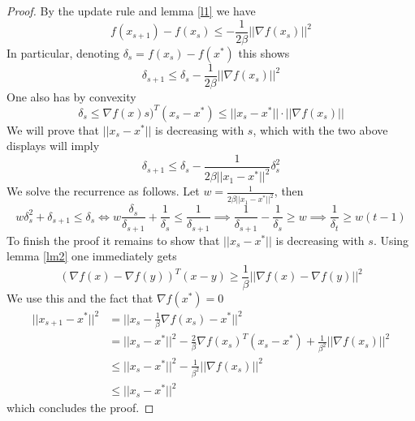 \begin{proof}
By the update rule and lemma \ref{l1} we have
$$f(x_{s+1}) - f(x_s) \leq -\frac{1}{2\beta}||\nabla f(x_s)||^2 $$
In particular, denoting $\delta_s = f(x_s) - f(x^*)$ this shows
$$\delta_{s+1} \leq \delta_s - \frac{1}{2\beta}||\nabla f(x_s)||^2 $$
One also has by convexity
$$\delta_s \leq \nabla f(x)s)^T(x_s - x^*) \leq ||x_s - x^*|| \cdot ||\nabla f(x_s)||$$
We will prove that $||x_s - x^*||$ is decreasing with $s$, which with the two above displays will imply
$$\delta_{s+1}\leq \delta_s - \frac{1}{2\beta||x_1 - x^*||^2}\delta_s^2$$
We solve the recurrence as follows.  Let $w = \frac{1}{2\beta||x_1 - x^*||^2}$, then
$$w\delta_s^2 + \delta_{s+1} \leq \delta_s \iff w\frac{\delta_s}{\delta_{s+1}} + \frac
{1}{\delta_s} \leq \frac{1}{\delta_{s+1}} \implies \frac{1}{\delta_{s+1}} - \frac{1}{\delta_s} \geq w \implies \frac{1}{\delta_t} \geq w(t-1)$$
To finish the proof it remains to show that $||x_s - x^*||$ is decreasing with $s$.  Using lemma \ref{lm2} one immediately gets
$$ (\nabla f(x) - \nabla f(y))^T(x - y) \geq \frac{1}{\beta} ||\nabla f(x) - \nabla f(y)||^2$$
We use this and the fact that $\nabla f(x^*) = 0$
\begin{align}
    ||x_{s+1} - x^*||^2 &= ||x_s - \frac{1}{\beta}\nabla f(x_s) - x^*||^2 \\
    &= ||x_s - x^*||^2 - \frac{2}{\beta}\nabla f(x_s)^T(x_s - x^*) + \frac{1}{\beta^2}||\nabla f(x_s)||^2 \\
    &\leq ||x_s - x^*||^2 - \frac{1}{\beta^2} ||\nabla f(x_s)||^2 \\
    &\leq ||x_s - x^*||^2
\end{align}
which concludes the proof.
\end{proof}

